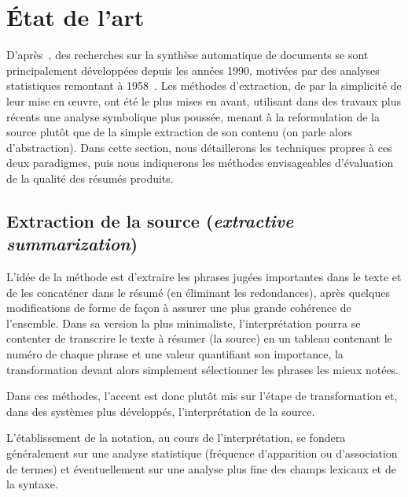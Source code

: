 \documentclass{article}           %
\begin{document}
\section{État de l'art} %
D'après~\cite{jones_automatic_2007}, des recherches sur la synthèse automatique de documents se sont principalement développées depuis les années 1990, motivées par des analyses statistiques remontant à 1958~\cite{}. Les méthodes d'extraction, de par la simplicité de leur mise en œuvre, ont été le plus mises en avant, utilisant dans des travaux plus récents une analyse symbolique plus poussée, menant à la reformulation de la source plut\^{o}t que de la simple extraction de son contenu (on parle alors d'abstraction). Dans cette section, nous détaillerons les techniques propres à ces deux paradigmes, puis nous indiquerons les méthodes envisageables d'évaluation de la qualité des résumés produits.

\subsection{Extraction de la source (\emph{extractive summarization})}

L'idée de la méthode est d'extraire les phrases jugées importantes dans le texte et de les concaténer dans le résumé (en éliminant les redondances), après quelques modifications de forme de façon à assurer une plus grande cohérence de l'ensemble. Dans sa version la plus minimaliste, l'interprétation pourra se contenter de transcrire le texte à résumer (la source) en un tableau contenant le numéro de chaque phrase et une valeur quantifiant son importance, la transformation devant alors simplement sélectionner les phrases les mieux notées. 

Dans ces méthodes, l'accent est donc plut\^{o}t mis sur l'étape de transformation et, dans des systèmes plus développés, l'interprétation de la source.

L'établissement de la notation, au cours de l'interprétation, se fondera généralement sur une analyse statistique (fréquence d'apparition ou d'association de termes) et éventuellement sur une analyse plus fine des champs lexicaux et de la syntaxe.
\end{document}
